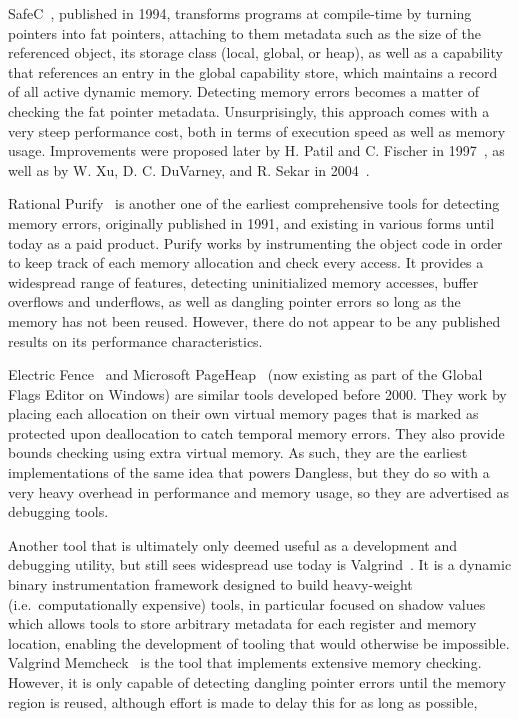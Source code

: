 SafeC~\cite{safec1994}, published in 1994, transforms programs at compile-time by turning pointers into fat pointers, attaching to them metadata such as the size of the referenced object, its storage class (local, global, or heap), as well as a capability that references an entry in the global capability store, which maintains a record of all active dynamic memory. Detecting memory errors becomes a matter of checking the fat pointer metadata. Unsurprisingly, this approach comes with a very steep performance cost, both in terms of execution speed as well as memory usage. Improvements were proposed later by H. Patil and C. Fischer in 1997~\cite{safec-improved1997}, as well as by W. Xu, D. C. DuVarney, and R. Sekar in 2004~\cite{safec-improved2004}.

Rational Purify~\cite{hastings1991purify} is another one of the earliest comprehensive tools for detecting memory errors, originally published in 1991, and existing in various forms until today as a paid product. Purify works by instrumenting the object code in order to keep track of each memory allocation and check every access. It provides a widespread range of features, detecting uninitialized memory accesses, buffer overflows and underflows, as well as dangling pointer errors so long as the memory has not been reused. However, there do not appear to be any published results on its performance characteristics.

Electric Fence~\cite{electric-fence} and Microsoft PageHeap~\cite{pageheap} (now existing as part of the Global Flags Editor on Windows) are similar tools developed before 2000. They work by placing each allocation on their own virtual memory pages that is marked as protected upon deallocation to catch temporal memory errors. They also provide bounds checking using extra virtual memory. As such, they are the earliest implementations of the same idea that powers Dangless, but they do so with a very heavy overhead in performance and memory usage, so they are advertised as debugging tools.

Another tool that is ultimately only deemed useful as a development and debugging utility, but still sees widespread use today is Valgrind~\cite{valgrind2007}. It is a dynamic binary instrumentation framework designed to build heavy-weight (i.e.\ computationally expensive) tools, in particular focused on shadow values which allows tools to store arbitrary metadata for each register and memory location, enabling the development of tooling that would otherwise be impossible. Valgrind Memcheck~\cite{valgrind-memcheck-web} is the tool that implements extensive memory checking. However, it is only capable of detecting dangling pointer errors until the memory region is reused, although effort is made to delay this for as long as possible,


